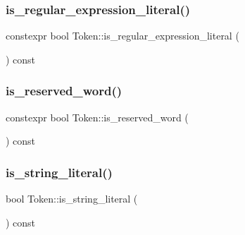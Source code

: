 \subsubsection{\texorpdfstring{is\+\_\+regular\+\_\+expression\+\_\+literal()}{is\_regular\_expression\_literal()}\hspace{0.1cm}{\footnotesize\ttfamily [2/2]}}
{\footnotesize\ttfamily constexpr bool Token\+::is\+\_\+regular\+\_\+expression\+\_\+literal (\begin{DoxyParamCaption}{ }\end{DoxyParamCaption}) const\hspace{0.3cm}{\ttfamily [inline]}}

\mbox{\label{class_token_ae87de0ad9832e1799e0ea15179b6abb5}} 
\subsubsection{\texorpdfstring{is\+\_\+reserved\+\_\+word()}{is\_reserved\_word()}}
{\footnotesize\ttfamily constexpr bool Token\+::is\+\_\+reserved\+\_\+word (\begin{DoxyParamCaption}{ }\end{DoxyParamCaption}) const\hspace{0.3cm}{\ttfamily [inline]}}

\mbox{\label{class_token_ad11f807932449af30ca904eac2e4a350}} 
\subsubsection{\texorpdfstring{is\+\_\+string\+\_\+literal()}{is\_string\_literal()}\hspace{0.1cm}{\footnotesize\ttfamily [1/2]}}
{\footnotesize\ttfamily bool Token\+::is\+\_\+string\+\_\+literal (\begin{DoxyParamCaption}{ }\end{DoxyParamCaption}) const}

\mbox{\label{class_token_a177fc1cf8c4956570fbe74e3b93507b5}} 
